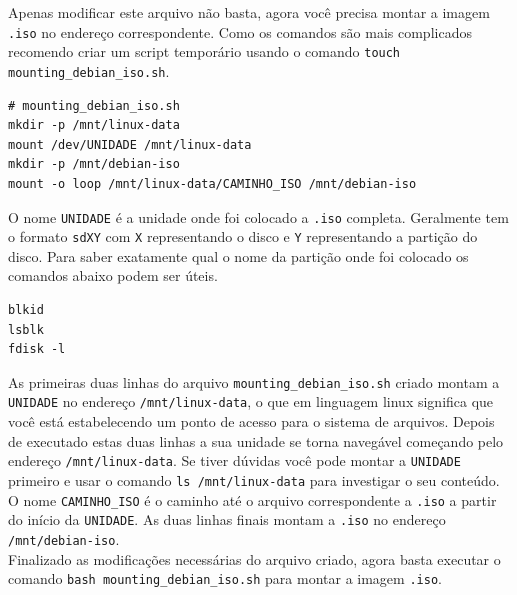 \documentclass[12pt,a4paper]{article}
\begin{document}
\vspace{\baselineskip}

Apenas modificar este arquivo não basta, agora você precisa montar a imagem \texttt{.iso} no endereço correspondente. Como os comandos são mais complicados recomendo criar um script temporário usando o comando \texttt{touch mounting\_debian\_iso.sh}.\\

\begin{lstlisting}
# mounting_debian_iso.sh
mkdir -p /mnt/linux-data
mount /dev/UNIDADE /mnt/linux-data
mkdir -p /mnt/debian-iso
mount -o loop /mnt/linux-data/CAMINHO_ISO /mnt/debian-iso
\end{lstlisting}

\vspace{\baselineskip}

O nome \texttt{UNIDADE} é a unidade onde foi colocado a \texttt{.iso} completa. Geralmente tem o formato \texttt{sdXY} com \texttt{X} representando o disco e \texttt{Y} representando a partição do disco. Para saber exatamente qual o nome da partição onde foi colocado os comandos abaixo podem ser úteis.\\

\begin{lstlisting}
blkid
lsblk
fdisk -l 
\end{lstlisting}

\vspace{\baselineskip}

As primeiras duas linhas do arquivo \texttt{mounting\_debian\_iso.sh} criado montam a \texttt{UNIDADE} no endereço \texttt{/mnt/linux-data}, o que em linguagem linux significa que você está estabelecendo um ponto de acesso para o sistema de arquivos. Depois de executado estas duas linhas a sua unidade se torna navegável começando pelo endereço \texttt{/mnt/linux-data}. Se tiver dúvidas você pode montar a \texttt{UNIDADE} primeiro e usar o comando \texttt{ls /mnt/linux-data} para investigar o seu conteúdo.\\

O nome \texttt{CAMINHO\_ISO} é o caminho até o arquivo correspondente a \texttt{.iso} a partir do início da \texttt{UNIDADE}. As duas linhas finais montam a \texttt{.iso} no endereço \texttt{/mnt/debian-iso}. \\

Finalizado as modificações necessárias do arquivo criado, agora basta executar o comando \texttt{bash mounting\_debian\_iso.sh} para montar a imagem \texttt{.iso}.\\
\end{document}
